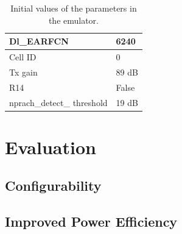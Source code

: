 \begin{table}[H]
\begin{minipage}[t]{0.48\textwidth}
\begin{tabular}{|p{4cm}|p{2cm}|}
Dl\_EARFCN         & 6240           \\ \hline
Cell ID            & 0              \\ \hline
Tx gain            & 89 dB          \\ \hline
R14                & False          \\ \hline
nprach\_detect\_ threshold  & 19 dB  \\ \hline
\end{tabular}
\end{minipage}
\caption{Initial values of the parameters in the emulator.}
\label{tab:setup_parameters}
\end{table}


\section{Evaluation}


\subsection{Configurability}





\subsection{Improved Power Efficiency}
